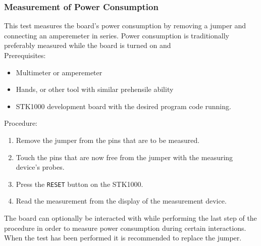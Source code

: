 \subsubsection{Measurement of Power Consumption}
This test measures the board's power consumption by removing a jumper and connecting an amperemeter in series.
Power consumption is traditionally preferably measured while the board is turned on and 
\\
Prerequisites:
\begin{itemize}
	\item{Multimeter or amperemeter}
	\item{Hands, or other tool with similar prehensile ability}
    \item{STK1000 development board with the desired program code running.}
\end{itemize}
Procedure:
\begin{enumerate}
    \item{Remove the jumper from the pins that are to be measured.}
    \item{Touch the pins that are now free from the jumper with the measuring device's probes.}
	\item{Press the \texttt{RESET} button on the STK1000.}
    \item{Read the measurement from the display of the measurement device.}
\end{enumerate}
The board can optionally be interacted with while performing the last step of the procedure in order to measure power consumption during certain interactions.
When the test has been performed it is recommended to replace the jumper.
